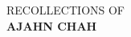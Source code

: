
\thispagestyle{empty}

\vspace*{5em}

{\raggedleft

\begin{minipage}{0.7\textwidth}
\partTitleFont\Huge RECOLLECTIONS OF\\
\color[gray]{0.6}\textbf{AJAHN CHAH}
\end{minipage}

}

